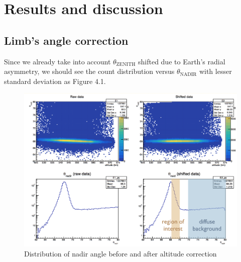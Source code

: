 \chapter{Results and discussion}


\section{Limb's angle correction}
Since we already take into account $\theta_\text{ZENITH}$ shifted due to Earth's radial asymmetry, we should see the count distribution versus $\theta_\text{NADIR}$ with lesser standard deviation as Figure 4.1.

\begin{figure}[h!]
    \centering
      \includegraphics[width=\textwidth]{img/LATShifted}
      \caption{Distribution of nadir angle before and after altitude correction}
\end{figure}

